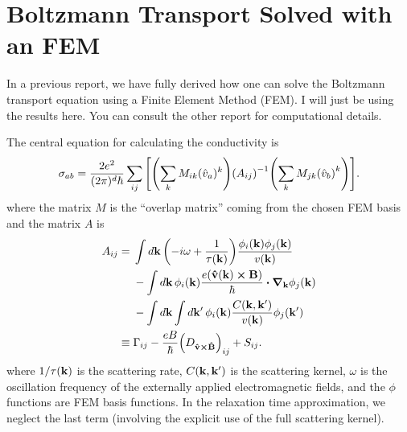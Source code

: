 \documentclass[12pt]{article}
\begin{document}
\section{Boltzmann Transport Solved with an FEM}
In a previous report, we have fully derived how one can solve the Boltzmann transport equation using a Finite Element Method (FEM). I will just be using the results here. You can consult the other report for computational details. 

The central equation for calculating the conductivity is
\begin{equation}
    \sigma_{ab} = \frac{2e^2}{(2\pi)^d\hbar} \sum_{ij} \qty[
    \qty(\sum_k M_{ik} (\hat{v}_a)^k) \qty(A_{ij})^{-1} \qty(\sum_k M_{jk} \qty(\hat{v}_b)^k)].
\end{equation}
where the matrix $M$ is the ``overlap matrix'' coming from the chosen FEM basis and the matrix $A$ is
\begin{align}
A_{ij} &= \begin{aligned}[t]
    &\int\dd{\vb{k}} \qty(-i\omega + \frac{1}{\tau(\vb{k})})
        \frac{\phi_i(\vb{k})\phi_j(\vb{k})}{v(\vb{k})} \\
    &-\int\dd{\vb{k}} \phi_i(\vb{k})\frac{e\qty(\vu{v}(\vb{k})\cross\vb{B})}{\hbar}
        \vdot\grad_{\vb{k}}\phi_j(\vb{k}) \\
    &- \int\dd{\vb{k}} \int\dd{\vb{k'}}
    \phi_i(\vb{k}) \frac{C(\vb{k},\vb{k'})}{v(\vb{k})} \phi_j(\vb{k'})
\end{aligned} \\
&\equiv \Gamma_{ij} - \frac{eB}{\hbar} \qty(D_{\vu{v}\cross\vu{B}})_{ij} + S_{ij}.
\end{align}
where $1/\tau(\vb{k})$ is the scattering rate, $C(\vb{k}, \vb{k'})$ is the scattering kernel,
$\omega$ is the oscillation frequency of the externally applied electromagnetic fields,
and the $\phi$ functions are FEM basis functions.
In the relaxation time approximation, we neglect the last term
(involving the explicit use of the full scattering kernel).
\end{document}
